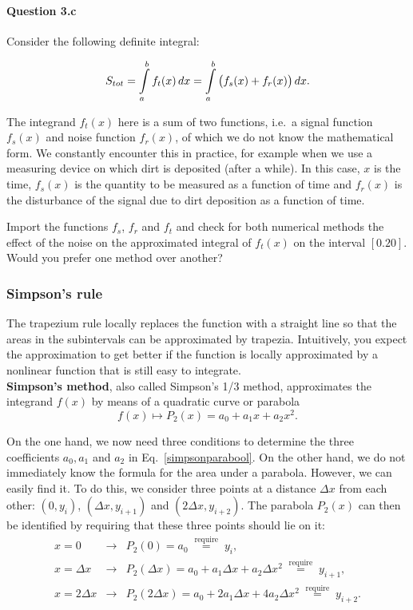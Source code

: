 \paragraph{Question 3.c}
Consider the following definite integral:

 $$S_{tot} = \displaystyle\int\limits^{b}_{a}{f_{t}(x)} \,dx= \displaystyle\int\limits^{b}_{a}{\left(f_{s}(x) + f_{r}(x) \right)} \,dx.$$

The integrand $f_{t}(x)$ here is a sum of two functions, i.e.\ a signal function $f_{s}(x)$ and noise function $f_{r}(x)$, of which we do not know the mathematical form. We constantly encounter this in practice, for example when we use a measuring device on which dirt is deposited (after a while). In this case, $x$ is the time, $f_{s}(x)$ is the quantity to be measured as a function of time and $f_{r}(x)$ is the disturbance of the signal due to dirt deposition as a function of time.

Import the functions $f_s$, $f_r$ and $f_t$ and check for both numerical methods the effect of the noise on the approximated integral of $f_{t}(x)$ on the interval $[0.20]$. Would you prefer one method over another?

\subsubsection{Simpson's rule}\label{pc:integratie_SIMP}
The trapezium rule locally replaces the function with a straight line so that the areas in the subintervals can be approximated by trapezia. Intuitively, you expect the approximation to get better if the function is locally approximated by a nonlinear function that is still easy to integrate.\\

\textbf{Simpson's method}, also called Simpson's 1/3 method, approximates the integrand $f(x)$ by means of a quadratic curve or parabola
\begin{equation}
    f(x) \mapsto P_2(x) = a_0 + a_1 x + a_2 x^2.
    \label{simpsonparabool}
\end{equation}

On the one hand, we now need three conditions to determine the three coefficients $a_0, a_1$ and $a_2$ in Eq.~\eqref{simpsonparabool}. On the other hand, we do not immediately know the formula for the area under a parabola. However, we can easily find it. To do this, we consider three points at a distance $\Delta x$ from each other: $(0, y_i)$, $\left(\Delta x, y_{i+1}\right)$ and $\left(2\Delta x, y_{i+2}\right)$. The parabola $P_2(x)$ can then be identified by requiring that these three points should lie on it:
\begin{eqnarray*}
x = 0 &\rightarrow& P_2(0) = a_0  \; \stackrel{\text{require}}{=}  \; y_i, \\
x = \Delta x &\rightarrow& P_2(\Delta x) = a_0 + a_1 \Delta x + a_2 \Delta x^2 \; \stackrel{\text{require}}{=} \; y_{i+1}, \\
x = 2\Delta x &\rightarrow& P_2(2\Delta x) = a_0 + 2 a_1 \Delta x + 4 a_2 \Delta x^2  \; \stackrel{\text{require}}{=}  \; y_{i+2}. 
\end{eqnarray*}

